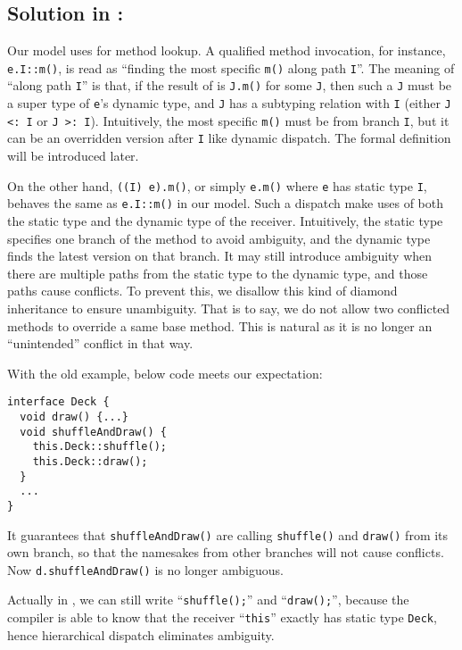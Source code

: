 \subsection{Solution in \MIM: \dispatchnamecaptical}
Our \MIM{} model uses \dispatchnameit{} for method lookup. A qualified method invocation, for instance, \lstinline|e.I::m()|, is read as ``finding the most specific \lstinline|m()| along path \lstinline|I|''. The meaning of ``along path \lstinline|I|'' is that, if the result of \dispatch{} is \lstinline|J.m()| for some \lstinline|J|, then such a \lstinline|J| must be a super type of \lstinline|e|'s dynamic type, and \lstinline|J| has a subtyping relation with \lstinline|I| (either \lstinline|J <: I| or \lstinline|J >: I|). Intuitively, the most specific \lstinline|m()| must be from branch \lstinline|I|, but it can be an overridden version after \lstinline|I| like dynamic dispatch. The formal definition will be introduced later.

On the other hand, \lstinline|((I) e).m()|, or simply \lstinline|e.m()| where \lstinline|e| has static type \lstinline|I|, behaves the same as \lstinline|e.I::m()| in our model. Such a dispatch make uses of both the static type and the dynamic type of the receiver. Intuitively, the static type specifies one branch of the method to avoid ambiguity, and the dynamic type finds the latest version on that branch. It may still introduce ambiguity when there are multiple paths from the static type to the dynamic type, and those paths cause conflicts. To prevent this, we disallow this kind of diamond inheritance to ensure unambiguity. That is to say, we do not allow two conflicted methods to override a same base method. This is natural as it is no longer an ``unintended'' conflict in that way.

With the old example, below code meets our expectation:
\vspace{3pt}\begin{lstlisting}
interface Deck {
  void draw() {...}
  void shuffleAndDraw() {
    this.Deck::shuffle();
    this.Deck::draw();
  }
  ...
}
\end{lstlisting}\vspace{3pt}
It guarantees that \lstinline|shuffleAndDraw()| are calling \lstinline|shuffle()| and \lstinline|draw()| from its own branch, so that the namesakes
from other branches will not cause conflicts. Now \lstinline|d.shuffleAndDraw()| is no longer ambiguous.

Actually in \MIM{}, we can still write ``\lstinline|shuffle();|'' and ``\lstinline|draw();|'',
because the compiler is able to know that the receiver ``\lstinline|this|'' exactly has static type \lstinline|Deck|, hence hierarchical dispatch eliminates ambiguity.


